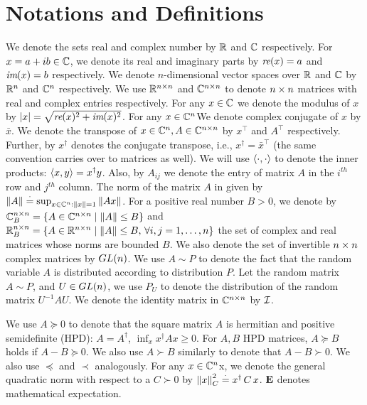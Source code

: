 \section{Notations and Definitions}\label{sec:def}

We denote the sets real and complex number by $\mathbb{R}$ and $\mathbb{C}$ respectively. For $x=a+ib\in \mathbb{C}$, we denote its real and imaginary parts by $\emph{re}(x)=a$ and $\emph{im}(x)=b$ respectively. We denote $n$-dimensional vector spaces over $\mathbb{R}$ and $\mathbb{C}$ by $\mathbb{R}^{n}$ and $\mathbb{C}^{n}$ respectively. We use $\mathbb{R}^{n\times n}$ and $\mathbb{C}^{n\times n}$ to denote $n\times n$ matrices with real and complex entries respectively. For any $x\in \mathbb{C}$ we denote the modulus of $x$ by $\left|x\right|=\sqrt{\emph{re}(x)^2+\emph{im}(x)^2}$. For any $x\in \mathbb{C}^n$We denote complex conjugate of $x$ by $\bar{x}$. We denote the transpose of $x\in \mathbb{C}^{n}, A\in \mathbb{C}^{n\times n}$ by $x^\top$ and $A^\top$ respectively. Further, by $x^\dag$ denotes the conjugate transpose, i.e., $x^\dag=\bar{x}^\top$ (the same convention carries over to matrices as well). We will use $\langle\cdot,\cdot\rangle$ to denote the inner products: $\langle x,y\rangle=x^\dag y$. Also, by $A_{ij}$ we denote the entry of matrix $A$ in the $i^{th}$ row and $j^{th}$ column.
The norm of the matrix $A$ in given by $\left\| A\right\|\stackrel{\cdot}{=} \sup_{x\in \mathbb{C}^n:\left\| x\right\|=1} \left\| Ax\right\|$. For a positive real number $B>0$, we denote by $\mathbb{C}^{n\times n}_B=\{A\in \mathbb{C}^{n\times n}\mid \left\| A\right\|\leq B\}$ and  $\mathbb{R}^{n\times n}_B=\{A\in \mathbb{R}^{n\times n}\mid \left\| A\right\|\leq B,\,\forall i,j=1,\ldots,n\}$ the set of complex and real matrices whose norms are bounded $B$.
We also denote the set of invertible $n\times n$ complex matrices by $GL(n)$. We use $A\sim P$ to denote the fact that the random variable $A$ is distributed according to distribution $P$. Let the random matrix $A\sim P$, and $U\in GL(n)$, we use $P_U$ to denote the distribution of the random matrix $U^{-1}A U$.  We denote the identity matrix in $\mathbb{C}^{n\times n}$ by $\mathcal{I}$.

We use $A\succeq 0$ to denote that the
square matrix $A$ is hermitian and positive semidefinite (HPD):
$A = A^\dag$, $\inf_x x^\dag A x\ge 0$.
For $A,B$ HPD matrices, $A\succeq B$ holds if $A-B\succeq 0$.
We also use $A\succ B$ similarly to denote that $A-B \succ 0$.
We also use $\preceq$ and $\prec$ analogously. For any $x\in\mathbb{C}^n$x, we denote the general quadratic norm with respect to a $C\succ 0$ by $\left\| x\right\|^2_C\stackrel{\cdot}{=} x^\dag\, C \,x$.
$\mathbf{E}$ denotes mathematical expectation.

